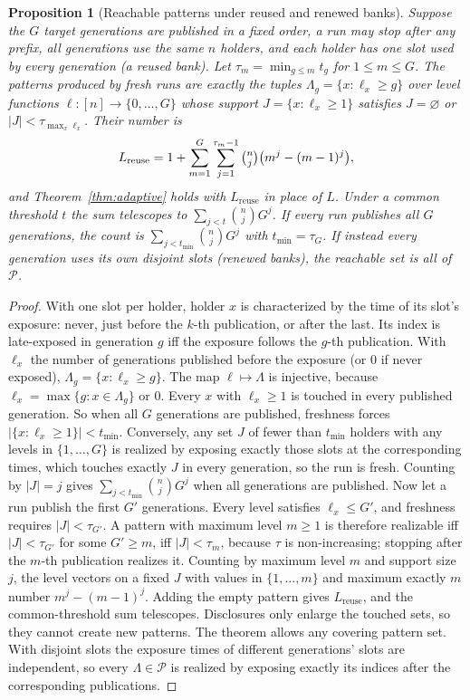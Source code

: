 \documentclass[pdflatex,sn-mathphys-num,twocolumn]{sn-jnl}
\theoremstyle{plain}
\newtheorem{proposition}[theorem]{Proposition}
\theoremstyle{definition}
\begin{document}
\begin{proposition}[Reachable patterns under reused and renewed banks]\label{prop:patterns}
Suppose the $G$ target generations are published in a fixed order, a run may stop after any prefix, all generations use the same $n$ holders, and each holder has one slot used by every generation (a reused bank). Let $\tau_m=\min_{g\le m}t_g$ for $1\le m\le G$. The patterns produced by fresh runs are exactly the tuples $\Lambda_g=\{x:\ell_x\ge g\}$ over level functions $\ell:[n]\to\{0,\dots,G\}$ whose support $J=\{x:\ell_x\ge1\}$ satisfies $J=\varnothing$ or $|J|<\tau_{\max_x\ell_x}$. Their number is
\[
 L_{\mathrm{reuse}}=1+\sum_{m=1}^{G}\sum_{j=1}^{\tau_m-1}\tbinom nj\big(m^j-(m-1)^j\big),
\]
and Theorem~\ref{thm:adaptive} holds with $L_{\mathrm{reuse}}$ in place of $L$. Under a common threshold $t$ the sum telescopes to $\sum_{j<t}\binom njG^j$. If every run publishes all $G$ generations, the count is $\sum_{j<t_{\min}}\binom njG^j$ with $t_{\min}=\tau_G$. If instead every generation uses its own disjoint slots (renewed banks), the reachable set is all of $\mathcal P$.
\end{proposition}
\begin{proof}
With one slot per holder, holder $x$ is characterized by the time of its slot's exposure: never, just before the $k$-th publication, or after the last. Its index is late-exposed in generation $g$ iff the exposure follows the $g$-th publication. With $\ell_x$ the number of generations published before the exposure (or $0$ if never exposed), $\Lambda_g=\{x:\ell_x\ge g\}$. The map $\ell\mapsto\Lambda$ is injective, because $\ell_x=\max\{g:x\in\Lambda_g\}$ or $0$. Every $x$ with $\ell_x\ge1$ is touched in every published generation. So when all $G$ generations are published, freshness forces $|\{x:\ell_x\ge1\}|<t_{\min}$. Conversely, any set $J$ of fewer than $t_{\min}$ holders with any levels in $\{1,\dots,G\}$ is realized by exposing exactly those slots at the corresponding times, which touches exactly $J$ in every generation, so the run is fresh. Counting by $|J|=j$ gives $\sum_{j<t_{\min}}\binom njG^j$ when all generations are published. Now let a run publish the first $G'$ generations. Every level satisfies $\ell_x\le G'$, and freshness requires $|J|<\tau_{G'}$. A pattern with maximum level $m\ge1$ is therefore realizable iff $|J|<\tau_{G'}$ for some $G'\ge m$, iff $|J|<\tau_m$, because $\tau$ is non-increasing; stopping after the $m$-th publication realizes it. Counting by maximum level $m$ and support size $j$, the level vectors on a fixed $J$ with values in $\{1,\dots,m\}$ and maximum exactly $m$ number $m^j-(m-1)^j$. Adding the empty pattern gives $L_{\mathrm{reuse}}$, and the common-threshold sum telescopes. Disclosures only enlarge the touched sets, so they cannot create new patterns. The theorem allows any covering pattern set. With disjoint slots the exposure times of different generations' slots are independent, so every $\Lambda\in\mathcal P$ is realized by exposing exactly its indices after the corresponding publications.
\end{proof}
\end{document}
